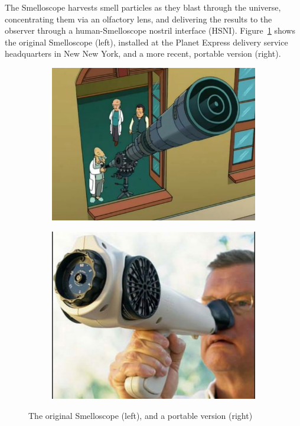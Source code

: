 \documentclass[singlespace]{../unmthesis}
\begin{document}
The Smelloscope harvests smell particles as they blast through the universe, concentrating them via 
an olfactory lens, and delivering the results to the observer through a human-Smelloscope nostril 
interface (HSNI). Figure~\ref{fig:smelloscope} shows the original Smelloscope (left), installed at the 
Planet Express delivery service headquarters in New New York, and a more recent, portable version (right).

\begin{figure}[ht]
\centering
\begin{subfigure}[b]{0.4\textwidth}
\includegraphics[width=\textwidth]{./figures/smelloscope01}
\end{subfigure}
\hfill
\begin{subfigure}[b]{0.4\textwidth}
\includegraphics[width=\textwidth]{./figures/smelloscope03}
\end{subfigure}
\caption{The original Smelloscope (left), and a portable version (right)}
\label{fig:smelloscope}
\end{figure}
\end{document}
